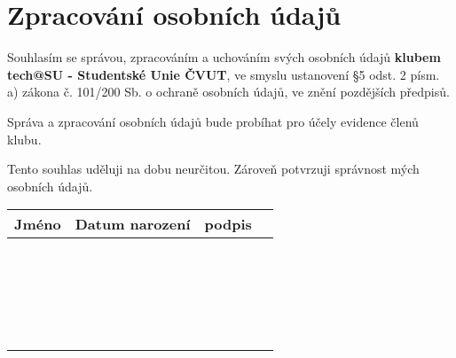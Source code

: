 \documentclass[10pt]{article}
\newcommand{\Th}[1]{\textbf{#1}}
\begin{document}
\section{Zpracování osobních údajů}
Souhlasím se správou, zpracováním a uchováním svých osobních údajů 
\textbf{klubem tech@SU - Studentské Unie ČVUT},
ve smyslu ustanovení §5 odst. 2 písm. a) zákona č. 101/200 Sb. o ochraně osobních údajů, ve znění pozdějších předpisů.

Správa a zpracování osobních údajů bude probíhat pro účely evidence členů klubu.

Tento souhlas uděluji na dobu neurčitou. Zároveň potvrzuji správnost mých osobních údajů.
\begin{center}
\begin{tabularx}{\textwidth}{ |X|X|X|X| }
\hline
\Th{Jméno} & \Th{Datum narození} & \Th{podpis} \\
\hline
&&\\[3ex]
\hline
&&\\[3ex]
\hline
&&\\[3ex]
\hline
&&\\[3ex]
\hline
&&\\[3ex]
\hline
&&\\[3ex]
\hline
&&\\[3ex]
\hline
&&\\[3ex]
\hline
&&\\[3ex]
\hline
&&\\[3ex]
\hline
&&\\[3ex]
\hline
&&\\[3ex]
\hline
&&\\[3ex]
\hline
&&\\[3ex]
\hline
&&\\[3ex]
\hline
&&\\[3ex]
\hline
&&\\[3ex]
\hline
&&\\[3ex]
\hline
&&\\[3ex]
\hline
&&\\[3ex]
\hline
&&\\[3ex]
\hline

\end{tabularx}
\end{center}
\end{document}
